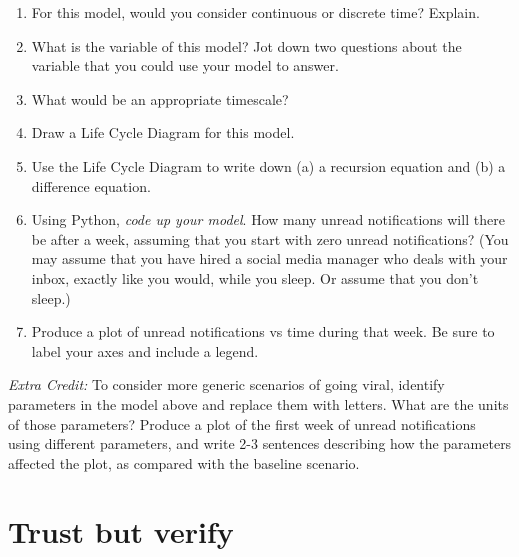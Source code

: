 \documentclass[11pt,onecolumn,superscriptaddress,notitlepage]{article}
\begin{document}
\begin{enumerate}[resume]
	\item For this model, would you consider continuous or discrete time? Explain. 
	\item What is the variable of this model? Jot down two questions about the variable that you could use your model to answer. 
	\item What would be an appropriate timescale? 
	\item Draw a Life Cycle Diagram for this model. 
	\item Use the Life Cycle Diagram to write down (a) a recursion equation and (b) a difference equation.
	\item Using Python, {\it code up your model}. How many unread notifications will there be after a week, assuming that you start with zero unread notifications? (You may assume that you have hired a social media manager who deals with your inbox, exactly like you would, while you sleep. Or assume that you don't sleep.)
	\item Produce a plot of unread notifications vs time during that week. Be sure to label your axes and include a legend. 
\end{enumerate}

{\it Extra Credit:} To consider more generic scenarios of going viral, identify parameters in the model above and replace them with letters. What are the units of those parameters? Produce a plot of the first week of unread notifications using different parameters, and write 2-3 sentences describing how the parameters affected the plot, as compared with the baseline scenario. 

\clearpage
\section*{Trust but verify}
\end{document}
